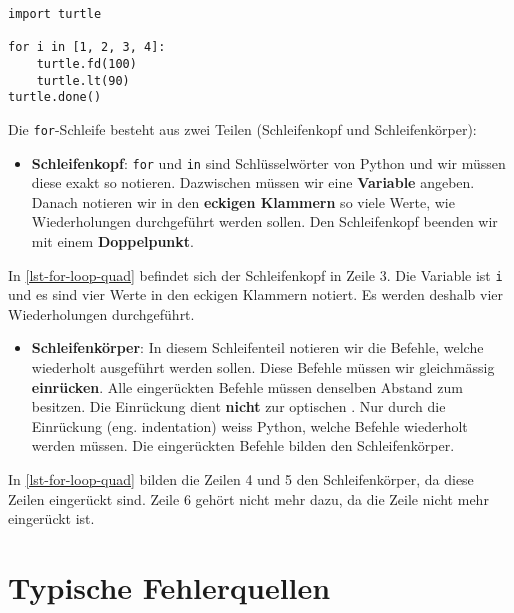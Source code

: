 \begin{lstlisting}[caption={Zeile vier und fünf wird jeweils viermal ausgeführt (\graybgtexttt{quadrat\_loop.py}).}, label=lst-for-loop-quad]
import turtle

for i in [1, 2, 3, 4]:
    turtle.fd(100)
    turtle.lt(90)
turtle.done()
\end{lstlisting}

Die \lstinline{for}-Schleife besteht aus zwei Teilen (Schleifenkopf und Schleifenkörper):

\begin{itemize}
	\item \textbf{Schleifenkopf}: \lstinline{for} und \lstinline{in} sind Schlüsselwörter von Python und wir müssen diese exakt so notieren. Dazwischen müssen wir eine \textbf{Variable} angeben. Danach notieren wir in den \textbf{eckigen Klammern} so viele Werte, wie Wiederholungen durchgeführt werden sollen. Den Schleifenkopf beenden wir mit einem \textbf{Doppelpunkt}.
\end{itemize}

\begin{example}
	In \autoref{lst-for-loop-quad} befindet sich der Schleifenkopf in Zeile $3$. Die Variable ist \lstinline{i} und es sind vier Werte in den eckigen Klammern notiert. Es werden deshalb vier Wiederholungen durchgeführt.
\end{example}

\begin{itemize}
	\item \textbf{Schleifenkörper}: In diesem Schleifenteil notieren wir die Befehle, welche wiederholt ausgeführt werden sollen. Diese Befehle müssen wir gleichmässig \textbf{einrücken}. Alle eingerückten Befehle müssen denselben Abstand zum  besitzen. Die Einrückung dient \textbf{nicht} zur optischen . Nur durch die Einrückung (eng. indentation) weiss Python, welche Befehle wiederholt werden müssen. Die eingerückten Befehle bilden den Schleifenkörper.
\end{itemize}

\begin{example}
	In \autoref{lst-for-loop-quad} bilden die Zeilen \num{4} und \num{5} den Schleifenkörper, da diese Zeilen eingerückt sind. Zeile \num{6} gehört nicht mehr dazu, da die Zeile nicht mehr eingerückt ist.
\end{example}

\section{Typische Fehlerquellen}


